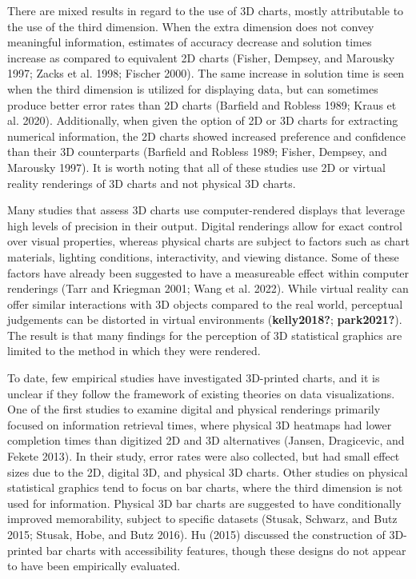 \documentclass[
  letterpaper,
  DIV=11,
  numbers=noendperiod]{scrartcl}
\begin{document}
There are mixed results in regard to the use of 3D charts, mostly
attributable to the use of the third dimension. When the extra dimension
does not convey meaningful information, estimates of accuracy decrease
and solution times increase as compared to equivalent 2D charts (Fisher,
Dempsey, and Marousky 1997; Zacks et al. 1998; Fischer 2000). The same
increase in solution time is seen when the third dimension is utilized
for displaying data, but can sometimes produce better error rates than
2D charts (Barfield and Robless 1989; Kraus et al. 2020). Additionally,
when given the option of 2D or 3D charts for extracting numerical
information, the 2D charts showed increased preference and confidence
than their 3D counterparts (Barfield and Robless 1989; Fisher, Dempsey,
and Marousky 1997). It is worth noting that all of these studies use 2D
or virtual reality renderings of 3D charts and not physical 3D charts.

Many studies that assess 3D charts use computer-rendered displays that
leverage high levels of precision in their output. Digital renderings
allow for exact control over visual properties, whereas physical charts
are subject to factors such as chart materials, lighting conditions,
interactivity, and viewing distance. Some of these factors have already
been suggested to have a measureable effect within computer renderings
(Tarr and Kriegman 2001; Wang et al. 2022). While virtual reality can
offer similar interactions with 3D objects compared to the real world,
perceptual judgements can be distorted in virtual environments
(\textbf{kelly2018?}; \textbf{park2021?}). The result is that many
findings for the perception of 3D statistical graphics are limited to
the method in which they were rendered.

To date, few empirical studies have investigated 3D-printed charts, and
it is unclear if they follow the framework of existing theories on data
visualizations. One of the first studies to examine digital and physical
renderings primarily focused on information retrieval times, where
physical 3D heatmaps had lower completion times than digitized 2D and 3D
alternatives (Jansen, Dragicevic, and Fekete 2013). In their study,
error rates were also collected, but had small effect sizes due to the
2D, digital 3D, and physical 3D charts. Other studies on physical
statistical graphics tend to focus on bar charts, where the third
dimension is not used for information. Physical 3D bar charts are
suggested to have conditionally improved memorability, subject to
specific datasets (Stusak, Schwarz, and Butz 2015; Stusak, Hobe, and
Butz 2016). Hu (2015) discussed the construction of 3D-printed bar
charts with accessibility features, though these designs do not appear
to have been empirically evaluated.
\end{document}
